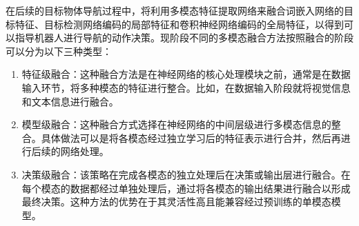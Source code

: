 在后续的目标物体导航过程中，将利用多模态特征提取网络来融合词嵌入网络的目标特征、目标检测网络编码的局部特征和卷积神经网络编码的全局特征，以得到可以指导机器人进行导航的动作决策。现阶段不同的多模态融合方法按照融合的阶段可以分为以下三种类型：
\begin{enumerate}[topsep = 0 pt, itemsep= 0 pt, parsep=0pt, partopsep=0pt, leftmargin=44pt, itemindent=0pt, labelsep=6pt, label=(\arabic*)]
    \item 	特征级融合：这种融合方法是在神经网络的核心处理模块之前，通常是在数据输入环节，将多种模态的特征进行整合。比如，在数据输入阶段就将视觉信息和文本信息进行融合。
    \item	模型级融合：这种融合方式选择在神经网络的中间层级进行多模态信息的整合。具体做法可以是将各模态经过独立学习后的特征表示进行合并，然后再进行后续的网络处理。
    \item	决策级融合：该策略在完成各模态的独立处理后在决策或输出层进行融合。在每个模态的数据都经过单独处理后，通过将各模态的输出结果进行融合以形成最终决策。这种方法的优势在于其灵活性高且能兼容经过预训练的单模态模型。
\end{enumerate}

